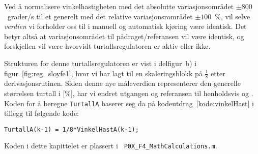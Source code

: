 Ved å normalisere
vinkelhastigheten med det absolutte variasjonsområdet
$\pm800$~grader/s til et generelt 
 med det relative variasjonsrområdet
$\pm100$~\%, vil selve {\em verdien} vi forholder oss til i manuell og
automatisk kjøring være identisk. Det betyr altså at 
variasjonsområdet til pådraget/referansen vil være
identisk, og forskjellen vil være hvorvidt
turtallsregulatoren er aktiv eller ikke.



Strukturen for denne turtallsregulatoren er vist i
delfigur~b) i figur~\ref{fig:reg_sloyfe1}, hvor vi har lagt til en
skaleringsblokk på $\frac{1}{8}$ etter derivasjonsrutinen. 
Siden denne nye måleverdien
representerer den generelle størrelsen 
turtall i [\%], har vi endret utgangen og
referansen til henholdsvis  og 
. Koden for å beregne {\tt TurtallA} baserer
seg da på kodeutdrag~\ref{kode:vinkelHast} i tillegg til 
følgende kode:
\begin{lstlisting}[caption=Kode for å beregne {\tt TurtallA}.,
  label=kode:rotHast, firstnumber=9]
TurtallA(k-1) = 1/8*VinkelHastA(k-1);
\end{lstlisting}

Koden i dette kapittelet er plassert i {\tt
  P0X\_F4\_MathCalculations.m}.




